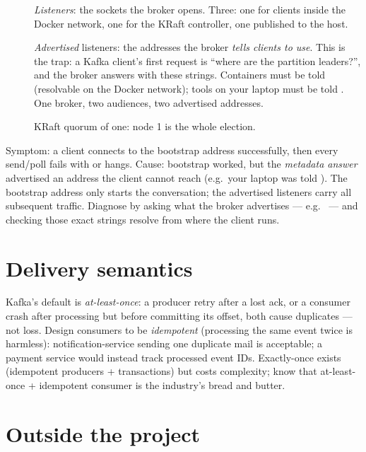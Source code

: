 \begin{description}
  \item[] \emph{Listeners}: the sockets the broker opens. Three:
  one for clients inside the Docker network, one for the KRaft
  controller, one published to the host.
  \item[] \emph{Advertised} listeners: the addresses the broker
  \emph{tells clients to use}. This is the trap: a Kafka client's first
  request is ``where are the partition leaders?'', and the broker answers
  with these strings. Containers must be told 
  (resolvable on the Docker network); tools on your laptop must be told
  . One broker, two audiences, two advertised
  addresses.
  \item[] KRaft quorum of one: node 1 is the whole election.
\end{description}

\begin{pitfall}
Symptom: a client connects to the bootstrap address successfully, then
every send/poll fails with  or hangs. Cause: bootstrap worked, but the \emph{metadata
answer} advertised an address the client cannot reach (e.g.\ your laptop
was told ). The bootstrap address only starts the
conversation; the advertised listeners carry all subsequent traffic.
Diagnose by asking what the broker advertises --- e.g.\
 --- and checking those exact strings
resolve from where the client runs.
\end{pitfall}

\section{Delivery semantics}

Kafka's default is \emph{at-least-once}: a producer retry after a lost
ack, or a consumer crash after processing but before committing its
offset, both cause duplicates --- not loss. Design consumers to be
\emph{idempotent} (processing the same event twice is harmless):
notification-service sending one duplicate mail is acceptable; a payment
service would instead track processed event IDs. Exactly-once exists
(idempotent producers + transactions) but costs complexity; know that
at-least-once + idempotent consumer is the industry's bread and butter.

\section{Outside the project}

